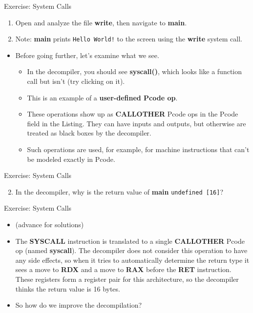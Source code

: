 \documentclass{beamer}
\begin{document}
\begin{frame}
\begin{block}{Exercise: System Calls}
\begin{enumerate}
\item Open and analyze the file \textbf{write}, then navigate to \textbf{main}.
\item[] Note: \textbf{main} prints \texttt{Hello World!} to the screen using the \textbf{write} system call.
\end{enumerate}
\begin{itemize}
\item Before going further, let's examine what we see.
\begin{itemize}
\item In the decompiler, you should see \textbf{syscall()}, which looks like a function call but isn't (try clicking on it). 
\item This is an example of a \textbf{user-defined Pcode op}.
\item These operations show up as \textbf{CALLOTHER} Pcode ops in the Pcode field in the Listing.  They can have inputs and outputs, but otherwise are treated
as black boxes by the decompiler.
\item Such operations are used, for example, for machine instructions that can't be modeled exactly in Pcode.  
\end{itemize}
\end{itemize}
\end{block}
\end{frame}

\begin{frame}
\begin{block}{Exercise: System Calls}
\begin{enumerate}
\setcounter{enumi}{1}
\item In the decompiler, why is the return value of \textbf{main} \texttt{undefined [16]}?
\end{enumerate}
\end{block}
\end{frame}

\begin{frame}
\begin{block}{Exercise: System Calls}
\begin{itemize}
\item[] (advance for solutions)
\pause
\item The \textbf{SYSCALL} instruction is translated to a single \textbf{CALLOTHER} Pcode op (named \textbf{syscall}).  The decompiler does not consider this operation to have any 
side effects, so when it tries to automatically determine the return type it sees a move to \textbf{RDX} and a move to \textbf{RAX} before the \textbf{RET} instruction.  
These registers form a register pair for this architecture, so the decompiler thinks the return value is 16 bytes.
\item So how do we improve the decompilation?
\end{itemize}
\end{block}
\end{frame}
\end{document}
